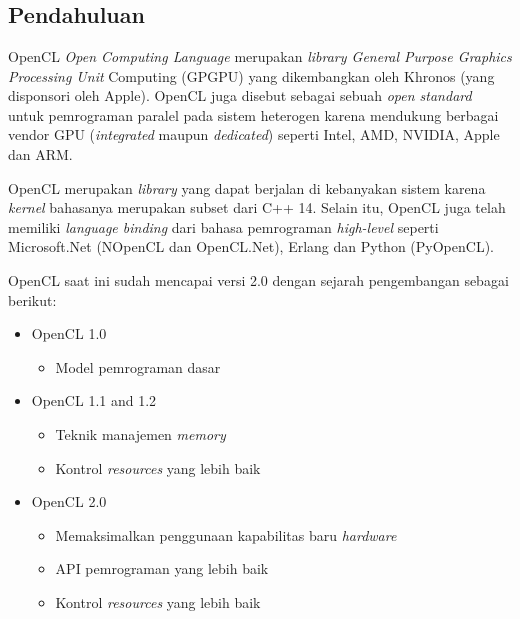 \chapter{\topikDua}

\section{Pendahuluan}

OpenCL \textit{Open Computing Language} merupakan \textit{library General Purpose Graphics Processing Unit} Computing (GPGPU) yang dikembangkan oleh Khronos (yang disponsori oleh Apple). OpenCL juga disebut sebagai sebuah \textit{open standard} untuk pemrograman paralel pada sistem heterogen karena mendukung berbagai vendor GPU (\textit{integrated} maupun \textit{dedicated}) seperti Intel, AMD, NVIDIA, Apple dan ARM.

OpenCL merupakan \textit{library} yang dapat berjalan di kebanyakan sistem karena \textit{kernel} bahasanya merupakan subset dari C++ 14. Selain itu, OpenCL juga telah memiliki \textit{language binding} dari bahasa pemrograman \textit{high-level} seperti Microsoft.Net (NOpenCL dan OpenCL.Net), Erlang dan Python (PyOpenCL).

OpenCL saat ini sudah mencapai versi 2.0 dengan sejarah pengembangan \cite{ opencl.mukherjee} sebagai berikut:

\begin{itemize}
	\item OpenCL 1.0​
	\begin{itemize}
		\item Model pemrograman dasar
	\end{itemize}
	\item OpenCL 1.1 and 1.2​
	\begin{itemize}
		\item Teknik manajemen \textit{memory}
		\item Kontrol \textit{resources} yang lebih baik
	\end{itemize}
	\item OpenCL 2.0​
	\begin{itemize}
		\item Memaksimalkan penggunaan kapabilitas baru \textit{hardware}
		\item API pemrograman yang lebih baik
		\item Kontrol \textit{resources} yang lebih baik
	\end{itemize}
\end{itemize}


